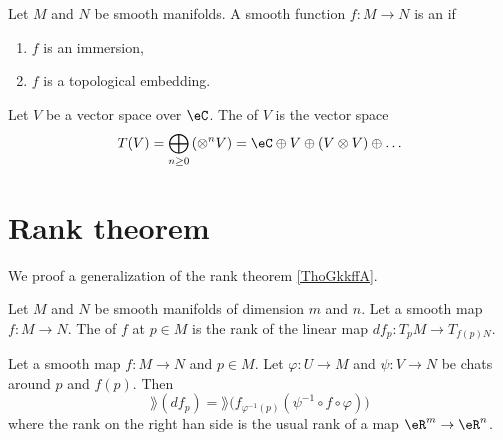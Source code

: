 \begin{definition}
    Let \( M\) and \( N\) be smooth manifolds. A smooth function \( f\colon M\to N\) is an  if
    \begin{enumerate}
        \item
            \( f\) is an immersion,
        \item
            \( f\) is a topological embedding.
    \end{enumerate}
\end{definition}

\begin{definition}      \label{DEFooHPQXooETvEyn}
    Let \( V\) be a vector space over \( \eC\). The  of \( V\) is the vector space
    \begin{equation}
        T(V)=\bigoplus_{n\geq 0}\left(\otimes^nV\right)=\eC\oplus V\oplus(V\otimes V)\oplus\ldots
    \end{equation}
\end{definition}


\section{Rank theorem}

We proof a generalization of the rank theorem \ref{ThoGkkffA}.

\begin{definition}
    Let \( M\) and \( N\) be smooth manifolds of dimension \( m\) and \( n\). Let a smooth map \( f\colon M\to N\). The  of \( f\) at \( p\in M\) is the rank of the linear map \( df_p\colon T_pM\to T_{f(p)N}\).
\end{definition}

\begin{lemma}
    Let a smooth map \( f\colon M\to N\) and \( p\in M\). Let \( \varphi\colon U\to M\) and \( \psi\colon V\to N\) be chats around \( p\) and \( f(p)\). Then
    \begin{equation}
        \rang(df_p)=\rang\big( f_{\varphi^{-1}(p)}(\psi^{-1}\circ f\circ \varphi) \big)
    \end{equation}
    where the rank on the right han side is the usual rank of a map \( \eR^m\to \eR^n\).
\end{lemma}


